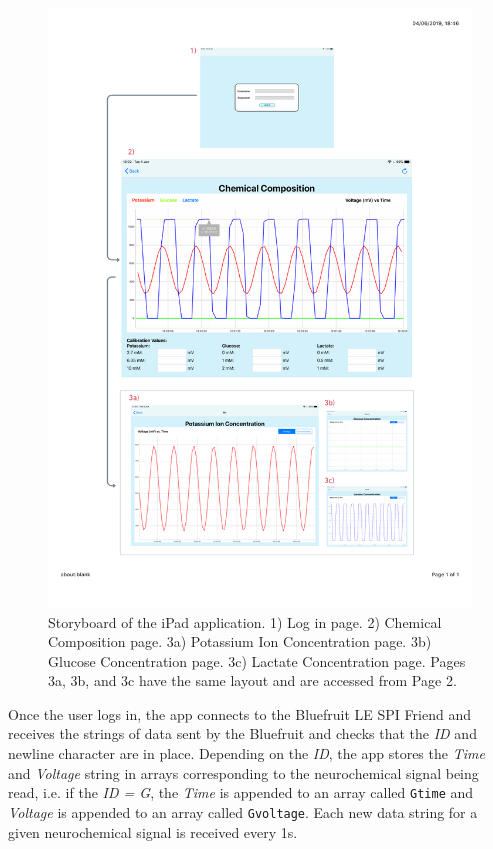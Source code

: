 \begin{figure}[p]
\centering
\includegraphics[trim={1cm 2.5cm 1cm  2cm}, clip, width=1\textwidth]{./figures/appStoryboard3.pdf}
\captionsetup{justification=centering}
\caption{Storyboard of the iPad application. 1) Log in page. 2) Chemical Composition page. 3a) Potassium Ion Concentration page. 3b) Glucose Concentration page. 3c) Lactate Concentration page. Pages 3a, 3b, and 3c have the same layout and are accessed from Page 2.}
\label{fig: storyboard}
\end{figure}

Once the user logs in, the app connects to the Bluefruit LE SPI Friend and receives the strings of data sent by the Bluefruit and checks that the \textit{ID} and newline character are in place. Depending on the \textit{ID}, the app stores the \textit{Time} and \textit{Voltage} string in arrays corresponding to the neurochemical signal being read, i.e. if the \textit{ID = G}, the \textit{Time} is appended to an array called  {\tt{Gtime}} and \textit{Voltage} is appended to an array called {\tt{Gvoltage}}. Each new data string for a given neurochemical signal is received every 1s. 

